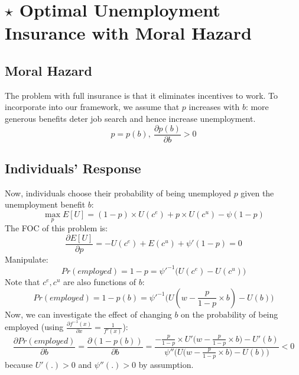 \section{$\star$ Optimal Unemployment Insurance with Moral Hazard}

    \subsection{Moral Hazard}
        The problem with full insurance is that it eliminates incentives to work. To incorporate  into our framework, we assume that $p$ increases with $b$: more generous benefits deter job search and hence increase unemployment.
        $$p=p(b),\ \frac{\partial p(b)}{\partial b}>0$$
        
    \subsection{Individuals' Response}
        Now, individuals choose their probability of being unemployed $p$ given the unemployment benefit $b$:
        $$\max_p E[U] = (1-p)\times{U(c^e)} + p\times{U(c^u)} - \psi(1-p)$$
        The FOC of this problem is:
        $$\frac{\partial E[U]}{\partial p}=-U(c^e)+E(c^u)+\psi'(1-p) = 0$$
        Manipulate:
        $$Pr(employed) = 1-p = \psi'^{-1}\Big(U(c^e)-U(c^u)\Big)$$
        Note that $c^e, c^u$ are also functions of $b$:
        \begin{equation}
            \label{eqn:ui_mh_optimal_p}
            Pr(employed) = 1-p(b) = \psi'^{-1}\Big(U(w-\frac{p}{1-p}\times{b})-U(b)\Big)
        \end{equation}
        Now, we can investigate the effect of changing $b$ on the probability of being employed (using $\frac{\partial f^{-1}(x)}{\partial x} = \frac{1}{f'(x)}$):
        $$\frac{\partial Pr(employed)}{\partial b}=\frac{\partial(1-p(b))}{\partial b} = \frac{-\frac{p}{1-p}\times{U'\big(w-\frac{p}{1-p}\times{b}\big)}-U'(b)}{\psi''\Big(U\big(w-\frac{p}{1-p}\times{b}\big)-U(b)\Big)} < 0$$
        because $U'(.)>0$ and $\psi''(.)>0$ by assumption.
        
